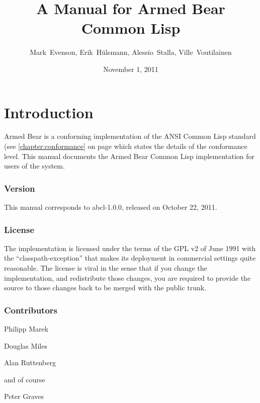 \documentclass[10pt]{book}
\begin{document}
\title{A Manual for Armed Bear Common Lisp}
\date{November 1, 2011}
\author{Mark~Evenson, Erik~H\"{u}lsmann, Alessio~Stalla, Ville~Voutilainen}

\maketitle

\tableofcontents

\chapter{Introduction}

Armed Bear is a conforming implementation of the ANSI Common Lisp
standard (see \ref{chapter:conformance} on page
\pageref{chapter:conformance} which states the details of the
conformance level.  This manual documents the Armed Bear Common Lisp
implementation for users of the system.

\subsection{Version}
This manual corresponds to abcl-1.0.0, released on October 22, 2011.

\subsection{License}

The implementation is licensed under the terms of the GPL v2 of June
1991 with the ``classpath-exception'' that makes its deployment in
commercial settings quite reasonable.  The license is viral in the
sense that if you change the implementation, and redistribute those
changes, you are required to provide the source to those changes back
to be merged with the public trunk.

\subsection{Contributors}


Philipp Marek

Douglas Miles

Alan Ruttenberg

and of course

Peter Graves
\end{document}

